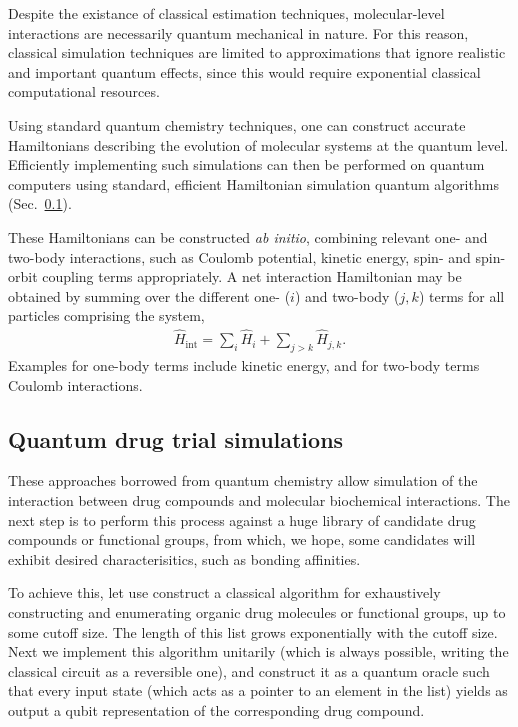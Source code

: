 \documentclass[aps,pra,twocolumn,amsmath,amssymb,nofootinbib,superscriptaddress]{revtex4}
\begin{document}
Despite the existance of classical estimation techniques, molecular-level interactions are necessarily quantum mechanical in nature. For this reason, classical simulation techniques are limited to approximations that ignore realistic and important quantum effects, since this would require exponential classical computational resources.

Using standard quantum chemistry techniques, one can construct accurate Hamiltonians describing the evolution of molecular systems at the quantum level. Efficiently implementing such simulations can then be performed on quantum computers using standard, efficient Hamiltonian simulation quantum algorithms (Sec.~\ref{}).

These Hamiltonians can be constructed \textit{ab initio}, combining relevant one- and two-body interactions, such as Coulomb potential, kinetic energy, spin- and spin-orbit coupling terms appropriately. A net interaction Hamiltonian may be obtained by summing over the different one- ($i$) and two-body (\mbox{$j,k$}) terms for all particles comprising the system,
\begin{align}
	\hat{H}_\mathrm{int} = \sum_i \hat{H}_i + \sum_{j>k} \hat{H}_{j,k}.
\end{align}
Examples for one-body terms include kinetic energy, and for two-body terms Coulomb interactions.

%
%

\subsection{Quantum drug trial simulations}

These approaches borrowed from quantum chemistry allow simulation of the interaction between drug compounds and molecular biochemical interactions. The next step is to perform this process against a huge library of candidate drug compounds or functional groups, from which, we hope, some candidates will exhibit desired characterisitics, such as bonding affinities.

To achieve this, let use construct a classical algorithm for exhaustively constructing and enumerating organic drug molecules or functional groups, up to some cutoff size. The length of this list grows exponentially with the cutoff size. Next we implement this algorithm unitarily (which is always possible, writing the classical circuit as a reversible one), and construct it as a quantum oracle such that every input state (which acts as a pointer to an element in the list) yields as output a qubit representation of the corresponding drug compound.
\end{document}
